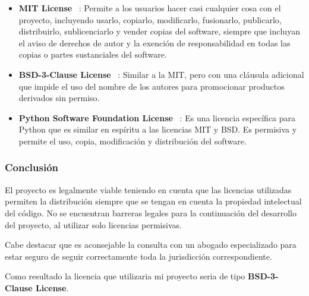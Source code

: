 \begin{itemize}
    \item \textbf{MIT License} ~\cite{wiki:MIT}: Permite a los usuarios hacer casi cualquier cosa con el proyecto, incluyendo usarlo, copiarlo, modificarlo, fusionarlo, publicarlo, distribuirlo, sublicenciarlo y vender copias del software, siempre que incluyan el aviso de derechos de autor y la exención de responsabilidad en todas las copias o partes sustanciales del software.
    \item \textbf{BSD-3-Clause License} ~\cite{wiki:BSD}: Similar a la MIT, pero con una cláusula adicional que impide el uso del nombre de los autores para promocionar productos derivados sin permiso.
    \item \textbf{Python Software Foundation License} ~\cite{wiki:PSFL}: Es una licencia específica para Python que es similar en espíritu a las licencias MIT y BSD. Es permisiva y permite el uso, copia, modificación y distribución del software.
\end{itemize}
\subsubsection{Conclusión}
El proyecto es legalmente viable teniendo en cuenta que las licencias utilizadas permiten la distribución siempre que se tengan en cuenta la propiedad intelectual del código. No se encuentran barreras legales para la continuación del desarrollo del proyecto, al utilizar solo licencias permisivas.

Cabe destacar que es aconsejable la consulta con un abogado especializado para estar seguro de seguir correctamente toda la jurisdicción  correspondiente.

Como resultado la licencia que utilizaria mi proyecto seria de tipo \textbf{BSD-3-Clause License}.